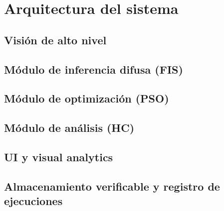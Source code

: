 \section{Arquitectura del sistema}\label{sec:arquitectura}

\subsection{Visión de alto nivel}\label{subsec:arch-highlevel}

\subsection{Módulo de inferencia difusa (FIS)}\label{subsec:arch-fis}

\subsection{Módulo de optimización (PSO)}\label{subsec:arch-pso}

\subsection{Módulo de análisis (HC)}\label{subsec:arch-hc}

\subsection{UI y visual analytics}\label{subsec:arch-ui}

\subsection{Almacenamiento verificable y registro de ejecuciones}\label{subsec:arch-storage}
